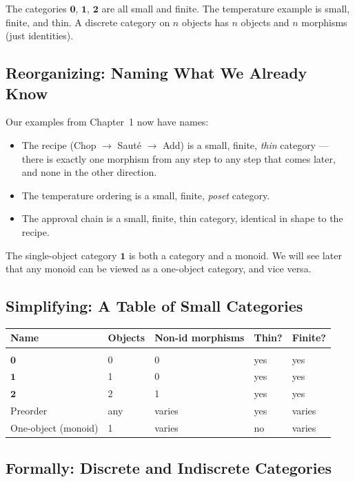 The categories $\mathbf{0}$, $\mathbf{1}$, $\mathbf{2}$ are all small and
finite. The temperature example is small, finite, and thin. A discrete
category on $n$ objects has $n$ objects and $n$ morphisms (just identities).

\subsection{Reorganizing: Naming What We Already Know}

Our examples from Chapter~1 now have names:
\begin{itemize}
  \item The recipe (Chop $\to$ Sauté $\to$ Add) is a small, finite,
        \emph{thin} category --- there is exactly one morphism from any
        step to any step that comes later, and none in the other direction.
  \item The temperature ordering is a small, finite, \emph{poset} category.
  \item The approval chain is a small, finite, thin category, identical in
        shape to the recipe.
\end{itemize}

The single-object category $\mathbf{1}$ is both a category and a monoid.
We will see later that any monoid can be viewed as a one-object category,
and vice versa.

\subsection{Simplifying: A Table of Small Categories}

\medskip
\begin{center}
\begin{tabular}{lllll}
  Name & Objects & Non-id morphisms & Thin? & Finite? \\[4pt]
  \hline\\[-6pt]
  $\mathbf{0}$ & 0 & 0 & yes & yes \\
  $\mathbf{1}$ & 1 & 0 & yes & yes \\
  $\mathbf{2}$ & 2 & 1 & yes & yes \\
  Preorder & any & varies & yes & varies \\
  One-object (monoid) & 1 & varies & no & varies \\
\end{tabular}
\end{center}
\medskip

\subsection{Formally: Discrete and Indiscrete Categories}

